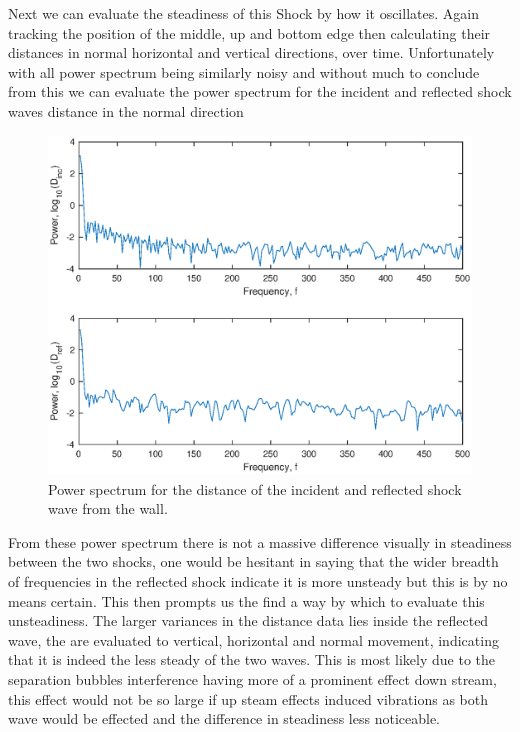 \documentclass[a4paper,10pt,twoside]{article}
\begin{document}
\begin{multicols}{2}
Next we can evaluate the steadiness of this Shock by how it oscillates. Again tracking the position of the middle, up and bottom edge then calculating their distances in normal horizontal and vertical directions, over time. Unfortunately with all power spectrum being similarly noisy and without much to conclude from this we can evaluate the power spectrum for the incident and reflected shock waves distance in the normal direction
\begin{figure}[H]
    \centering
    \includegraphics[width=\linewidth]{verhighres.eps}
    \caption{Power spectrum for the distance of the incident and reflected shock wave from the wall.}
    \label{fig:my_label}
\end{figure} \par


From these power spectrum there is not a massive difference visually in steadiness between the two shocks, one would be hesitant in saying that the wider breadth of frequencies in the reflected shock indicate it is more unsteady but this is by no means certain. This then prompts us the find a way by which to evaluate this unsteadiness. The larger variances in the distance data lies inside the reflected wave, the are evaluated to vertical, horizontal and normal movement, indicating that it is indeed the less steady of the two waves. This is most likely due to the separation bubbles interference having more of a prominent effect down stream, this effect would not be so large if up steam effects induced vibrations as both wave would be effected and the difference in steadiness less noticeable. \par






\end{multicols}
\end{document}
